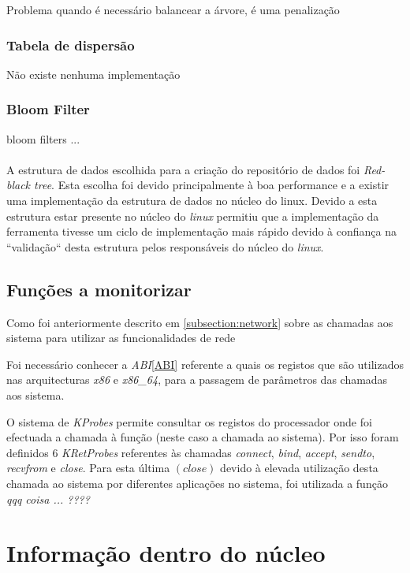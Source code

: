 Problema quando é necessário balancear a árvore, é uma penalização

\subsubsection{Tabela de dispersão}
Não existe nenhuma implementação 

\subsubsection{Bloom Filter}
bloom filters ...

\paragraph*{}
A estrutura de dados escolhida para a criação do repositório de dados foi
\textit{Red-black tree}. Esta escolha foi devido principalmente à boa
performance e a existir uma implementação da estrutura de dados no núcleo do
linux. Devido a esta estrutura estar presente no núcleo do \textit{linux}
permitiu que a implementação da ferramenta tivesse um ciclo de implementação
mais rápido devido à confiança na ``validação`` desta estrutura pelos
responsáveis do núcleo do \textit{linux}.

\subsection{Funções a monitorizar}


Como foi anteriormente descrito em \ref{subsection:network} sobre as chamadas
aos sistema para utilizar as funcionalidades de rede

Foi necessário conhecer a \textit{ABI}\ref{ABI}\cite{ABI} referente a quais os
registos que são utilizados nas arquitecturas \textit{x86} e \textit{x86\_64},
para a passagem de parâmetros das chamadas aos sistema.

O sistema de \textit{KProbes} permite consultar os registos do processador onde
foi efectuada a chamada à função (neste caso a chamada ao sistema). Por isso
foram definidos 6 \textit{KRetProbes} referentes às chamadas \textit{connect},
\textit{bind}, \textit{accept}, \textit{sendto}, \textit{recvfrom} e
\textit{close}. Para esta última $\left( \textit{close} \right)$ devido à
elevada utilização desta chamada ao sistema por diferentes aplicações no
sistema, foi utilizada a função \textit{qqq coisa ...  ????}

\section{Informação dentro do núcleo}

